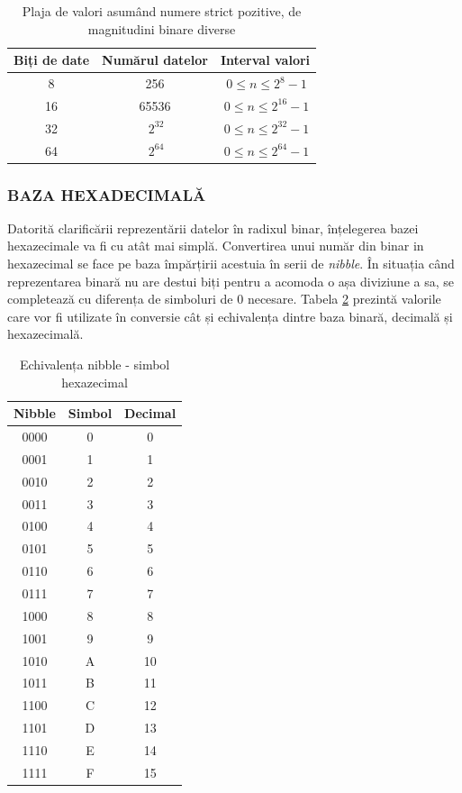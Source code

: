 \documentclass[12pt]{article}
\begin{document}
\begin{table}[h]
\centering
\begin{tabular}{ ||c|c|c|| }
 \hline
 Biți de date & Numărul datelor & Interval valori \\ 
 \hline  \hline
 8 & 256 & $\ 0 \le n \le 2^{8} - 1$ \\
 \hline
 16 & 65536 & $\ 0 \le n \le 2^{16} - 1$ \\
 \hline
 32 &  $\ 2^{32}$ & $\ 0 \le n \le 2^{32} - 1$ \\
 \hline
 64 & $\ 2^{64}$ & $\ 0 \le n \le 2^{64} -1$ \\
 \hline
\end{tabular}
\caption{Plaja de valori asumând numere strict pozitive, de magnitudini binare diverse }
\label{Tabela:2}
\end{table}

\subsubsection{BAZA HEXADECIMALĂ}
Datorită clarificării reprezentării datelor în radixul binar, înțelegerea bazei hexazecimale va fi cu atât mai simplă. Convertirea unui număr din binar in hexazecimal se face pe baza împărțirii acestuia în serii de \textit{nibble}. În situația când reprezentarea binară nu are destui biți pentru a acomoda o așa diviziune a sa, se completează cu diferența de simboluri de 0 necesare. Tabela \ref{Tabela:3} prezintă valorile care vor fi utilizate în conversie cât și echivalența dintre baza binară, decimală și hexazecimală.

\begin{table}[h]
\centering
\begin{tabular}{ ||c|c|c|| }
 \hline
 Nibble & Simbol & Decimal\\ 
 \hline  \hline
 0000 & 0 & 0\\
 \hline
 0001 & 1 & 1\\
 \hline
 0010 & 2 & 2\\
 \hline
 0011 &  3 & 3\\
 \hline
 0100 & 4 & 4\\
 \hline
 0101 & 5 & 5 \\
 \hline
 0110 & 6 & 6\\
 \hline
 0111 & 7 & 7\\
 \hline
 1000 & 8 & 8\\
 \hline
 1001 & 9 & 9\\
 \hline
 1010 & A & 10\\
 \hline
 1011 & B & 11\\
 \hline
 1100 & C & 12\\
 \hline
 1101 & D & 13\\
 \hline
 1110 & E & 14\\
 \hline
 1111 & F & 15\\
 \hline
\end{tabular}
\caption{Echivalența nibble - simbol hexazecimal }
\label{Tabela:3}
\end{table}
\end{document}
